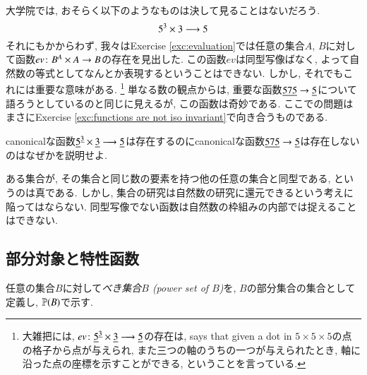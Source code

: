 大学院では, おそらく以下のようなものは決して見ることはないだろう.
$$5^3\times 3\longrightarrow 5$$
それにもかからわず, 我々はExercise \ref{exc:evaluation}では任意の集合$A$, $B$に対して函数$ev\colon B^A\times A\rightarrow B$の存在を見出した. この函数$ev$は同型写像ばなく, よって自然数の等式としてなんとか表現するということはできない. しかし, それでもこれには重要な意味がある.
\footnote{大雑把には, $ev\colon\underline{5}^{\underline{3}}\times\underline{3}\longrightarrow \underline{5}$の存在は,  says that given a dot in $5\times 5\times 5$の点の格子から点が与えられ, また三つの軸のうちの一つが与えられたとき, 軸に沿った点の座標を示すことができる, ということを言っている.} 単なる数の観点からは, 重要な函数$\underline{575}\rightarrow\underline{5}$について語ろうとしているのと同じに見えるが, この函数は奇妙である. ここでの問題はまさにExercise \ref{exc:functions are not iso invariant}で向き合うものである.

\begin{exercise}
canonicalな函数$\underline{5}^{\underline{3}}\times\underline{3}\longrightarrow \underline{5}$は存在するのにcanonicalな函数$\underline{575}\rightarrow\underline{5}$は存在しないのはなぜかを説明せよ.
\end{exercise}

\begin{slogan}
ある集合が, その集合と同じ数の要素を持つ他の任意の集合と同型である, というのは真である. しかし, 集合の研究は自然数の研究に還元できるという考えに陥ってはならない. 同型写像でない函数は自然数の枠組みの内部では捉えることはできない.
\end{slogan}


\subsection{部分対象と特性函数}

\begin{definition}\label{def:power set}


任意の集合$B$に対して\emph{べき集合$B$ (power set of $B$)}を, $B$の部分集合の集合として定義し, ${\mathbb P}(B)$で示す.

\end{definition}

